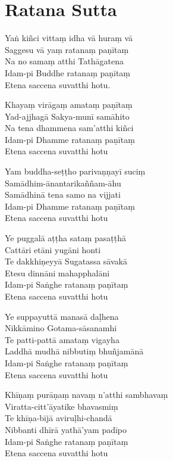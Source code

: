 \clearpage

\chapter{Ratana Sutta}%

\begin{paritta}
Yaṅ kiñci vittaṃ idha vā huraṃ vā\\
Saggesu vā yaṃ ratanaṃ paṇītaṃ\\
Na no samaṃ atthi Tathāgatena\\
Idam-pi Buddhe ratanaṃ paṇītaṃ\\
Etena saccena suvatthi hotu.

Khayaṃ virāgaṃ amataṃ paṇītaṃ\\
Yad-ajjhagā Sakya-munī samāhito\\
Na tena dhammena sam'atthi kiñci\\
Idam-pi Dhamme ratanaṃ paṇītaṃ\\
Etena saccena suvatthi hotu

Yam buddha-seṭṭho parivaṇṇayī suciṃ\\
Samādhim-ānantarikaññam-āhu\\
Samādhinā tena samo na vijjati\\
Idam-pi Dhamme ratanaṃ paṇītaṃ\\
Etena saccena suvatthi hotu

Ye puggalā aṭṭha sataṃ pasaṭṭhā\\
Cattāri etāni yugāni honti\\
Te dakkhiṇeyyā Sugatassa sāvakā\\
Etesu dinnāni mahapphalāni\\
Idam-pi Saṅghe ratanaṃ paṇītaṃ\\
Etena saccena suvatthi hotu

\enlargethispage{\baselineskip}

Ye suppayuttā manasā daḷhena\\
Nikkāmino Gotama-sāsanamhi\\
Te patti-pattā amataṃ vigayha\\
Laddhā mudhā nibbutiṃ bhuñjamānā\\
Idam-pi Saṅghe ratanaṃ paṇītaṃ\\
Etena saccena suvatthi hotu

Khīṇaṃ purāṇaṃ navaṃ n'atthi sambhavaṃ\\
Viratta-citt'āyatike bhavasmiṃ\\
Te khīṇa-bījā aviruḷhi-chandā\\
Nibbanti dhīrā yathā'yam padīpo\\
Idam-pi Saṅghe ratanaṃ paṇītaṃ\\
Etena saccena suvatthi hotu

\end{paritta}

